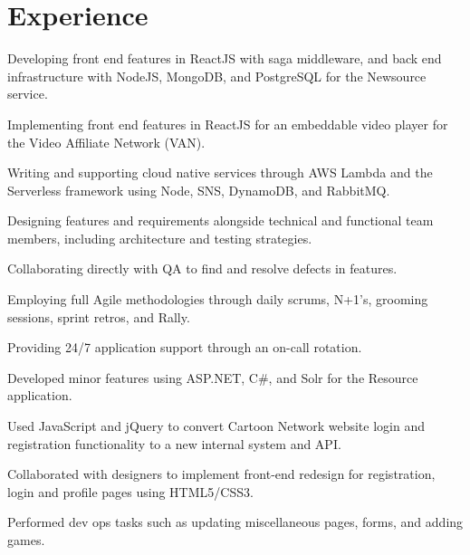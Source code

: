 \documentclass[]{deedy-resume-openfont}
\begin{document}

\sectionsep
\section{Experience}
\begin{tightemize}
\item Developing front end features in ReactJS with saga middleware, and back end infrastructure with NodeJS, MongoDB, and PostgreSQL for the Newsource service. 
\item Implementing front end features in ReactJS for an embeddable video player for the Video Affiliate Network (VAN).
\item Writing and supporting cloud native services through AWS Lambda and the Serverless framework using Node, SNS, DynamoDB, and RabbitMQ.
\item Designing features and requirements alongside technical and functional team members, including architecture and testing strategies.
\item Collaborating directly with QA to find and resolve defects in features.
\item Employing full Agile methodologies through daily scrums, N+1's, grooming sessions, sprint retros, and Rally.
\item Providing 24/7 application support through an on-call rotation.
\item Developed minor features using ASP.NET, C\#, and Solr for the Resource application.
\end{tightemize}
\sectionsep

\begin{tightemize}
\item Used JavaScript and jQuery to convert Cartoon Network website login and registration functionality to a new internal system and API.
\item Collaborated with designers to implement front-end redesign for registration, login and profile pages using HTML5/CSS3.
\item Performed dev ops tasks such as updating miscellaneous pages, forms, and adding games.
\end{tightemize}
\sectionsep

\sectionsep
\end{document}
